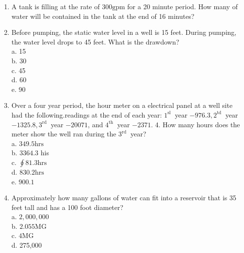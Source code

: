 \begin{enumerate}
\item A tank is filling at the rate of $300 \mathrm{gpm}$ for a 20 minute period. How many of water will be contained in the tank at the end of 16 minutes?\\

\item Before pumping, the static water level in a well is 15 feet. During pumping, the water level drops to 45 feet. What is the drawdown?\\
a. 15\\
b. 30\\
c. 45\\
d. 60\\
e. 90\\

\item Over a four year period, the hour meter on a electrical panel at a well site had the following.readings at the end of each year: $1^{\text {sl }}$ year $-976.3,2^{\text {td }}$ year $-1325.8,3^{\text {rd }}$ year $-20071$, and $4^{\text {th }}$ year $-2371$. 4. How many hours does the meter show the well ran during the $3^{\text {rd }}$ year?\\
a. $349.5 \mathrm{hrs}$\\
b. $3364.3$ his\\
c. $\oint 81.3 \mathrm{hrs}$\\
d. $830.2 \mathrm{hrs}$\\
e. $900.1$\\


\item Approximately how many gallons of water can fit into a reservoir that is 35 feet tall and has a 100 foot diameter?\\
a. $2,000,000$\\
b. $2.055 \mathrm{MG}$\\
c. $4 \mathrm{MG}$\\
d. 275,000\\



\end{enumerate}

